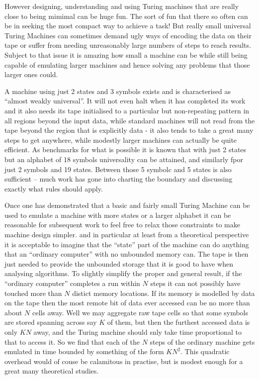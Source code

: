However designing, understanding and using Turing machines that are
really close to being mimimal can be huge fun. The sort of fun that
there so often can be in seeking the most compact way to achieve a
task! But really small universal Turing Machines can sometimes demand
ugly ways of encoding the data on their tape or suffer from needing
unreasonably large numbers of steps to reach results. Subject to that
issue it is amazing how small a machine can be while still being capable
of emulating larger machines and hence solving any problems that those
larger ones could.

A machine using just 2 states and 3 symbols exists and is characterised
as ``almost weakly universal''. It will not even halt when it has
completed its work and it also needs its tape initialised to
a particular but non-repeating  pattern in all regions beyond the input data,
while standard machines will not read from the tape beyond the region that is
explicitly data - it also tends to take a great many steps to get
anywhere, while modestly larger machines can actually be quite efficient.
As benchmarks for what is possible it is known that with just 2 states but
an alphabet of 18 symbols universality can be attained, and similarly
fpor just 2 symbols and 19 states. Between those 5 symbolc and 5 states
is also sufficient -- much work has gone into charting the boundary and
discussing exactly what rules should apply.



Once one has demonstrated that a basic and fairly small Turing Machine
can be used to emulate a machine with more states or a larger alphabet
it can be reasonable for subsequent work to feel free to relax those
constraints to make machine design simpler. and in particular at least
from a theoretical perspective it is acceptable to imagine that the
``state'' part of the machine can do anything that an ``ordinary
computer'' with no unbounded memory can. The tape is then just
needed to provide the unbounded storage that it is good to have
when analysing algorithms. To slightly simplify the proper and general result,
if the ``ordinary computer'' completes a run within $N$ steps it can
not possibly have touched more than $N$ distict memory locations. If
its memory is modelled by data on the tape then the most remote
bit of data ever accessed can be no more than about $N$ cells away.
Well we may aggregate raw tape cells so that some symbols are stored
spanning across say $K$ of them, but then the furthest accessed data
is only $K N$ away, and the Turing machine should snly take time
proportional to that to access it. So we find that each of the $N$ steps
of the ordinary machine gets emulated in time bounded by something of
the form $K N^2$. This quadratic overhead would of couse be calamitous in
practise, but is modest enough for a great many theoretical studies.



